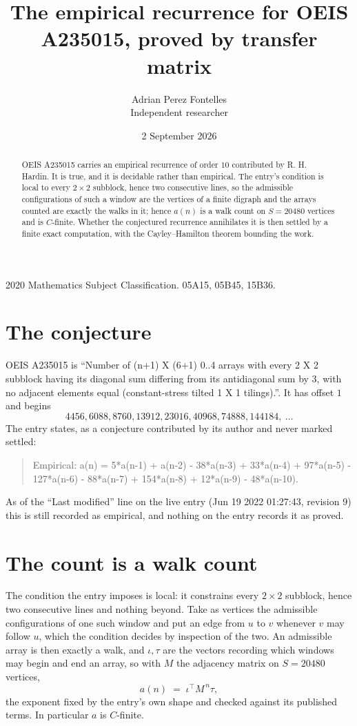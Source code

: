 \documentclass[11pt,a4paper]{article}
\title{The empirical recurrence for OEIS A235015, proved by transfer matrix}
\author{Adrian Perez Fontelles\\ \small Independent researcher}
\date{2 September 2026}
\theoremstyle{plain}
\theoremstyle{definition}
\begin{document}
\maketitle

\begin{abstract}
OEIS A235015 carries an empirical recurrence of order $10$ contributed by R. H. Hardin. It is
true, and it is decidable rather than empirical. The entry's condition is local to every $2\times2$ subblock, hence two consecutive lines, so
the admissible configurations of such a window are the vertices of a finite digraph and the
arrays counted are exactly the walks in it; hence $a(n)$ is a walk count on $S=20480$ vertices
and is $C$-finite. Whether the conjectured recurrence annihilates it is then settled by a
finite exact computation, with the Cayley--Hamilton theorem bounding the work.
\end{abstract}

\noindent\small 2020 Mathematics Subject Classification. 05A15, 05B45, 15B36.\normalsize

\section{The conjecture}

OEIS A235015 is ``Number of (n+1) X (6+1) 0..4 arrays with every 2 X 2 subblock having its diagonal sum differing from its antidiagonal sum by 3, with no adjacent elements equal (constant-stress tilted 1 X 1 tilings).''. It has offset $1$ and begins
\[
4456, 6088, 8760, 13912, 23016, 40968, 74888, 144184,\ \dots
\]
The entry states, as a conjecture contributed by its author and never marked settled:
\begin{quote}
Empirical: a(n) = 5*a(n-1) + a(n-2) - 38*a(n-3) + 33*a(n-4) + 97*a(n-5) - 127*a(n-6) - 88*a(n-7) + 154*a(n-8) + 12*a(n-9) - 48*a(n-10).
\end{quote}
As of the ``Last modified'' line on the live entry (Jun 19 2022 01:27:43, revision 9) this is still
recorded as empirical, and nothing on the entry records it as proved.

\section{The count is a walk count}

The condition the entry imposes is local: it constrains every $2\times2$ subblock, hence two consecutive lines and nothing beyond. Take as vertices the admissible configurations of one such window and put an edge from $u$ to $v$ whenever $v$ may follow $u$, which the condition decides by inspection of the two.
An admissible array is then exactly a walk, and $\iota,\tau$ are the vectors recording which windows may begin and end an array, so with $M$ the adjacency matrix on $S=20480$ vertices,
\[
a(n)\;=\;\iota^{\!\top}M^{\,n}\tau ,
\]
the exponent fixed by the entry's own shape and checked against its published terms. In
particular $a$ is $C$-finite.
\end{document}
